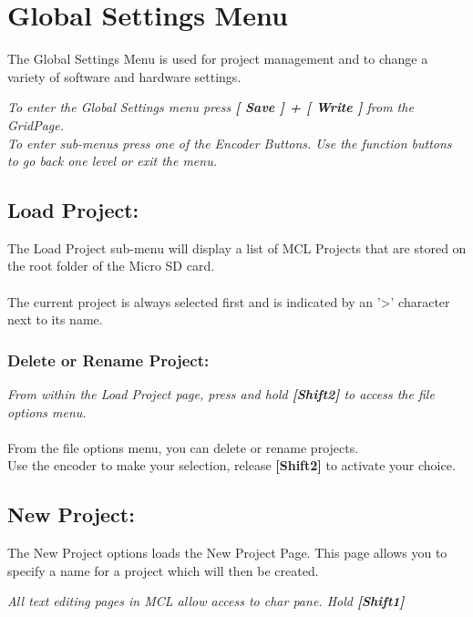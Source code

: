 \chapter{Global Settings Menu}
The Global Settings Menu is used for project management and to change a variety of software and hardware settings.


\textit{To enter the Global Settings menu press \textbf{[ Save ] + [ Write ]} from the GridPage.\\
To enter sub-menus press one of the Encoder Buttons. Use the function buttons to go back one level or exit the menu.}
\section{Load Project:}
The Load Project sub-menu will display a list of MCL Projects that are stored on the root folder of the Micro SD card.\\\\
The current project is always selected first and is indicated by an '>' character next to its name.

\subsection{Delete or Rename Project:}
\textit{From within the Load Project page, press and hold \textbf{[Shift2]} to access the file options menu.}\\\\
From the file options menu, you can delete or rename projects.\\
Use the encoder to make your selection, release \textbf{[Shift2]} to activate your choice.

\newpage
\section{New Project:}
The New Project options loads the New Project Page. This page allows you to specify a name for a project which will then be created.\\

\textit{All text editing pages in MCL allow access to char pane. Hold \textbf{[Shift1]}}
